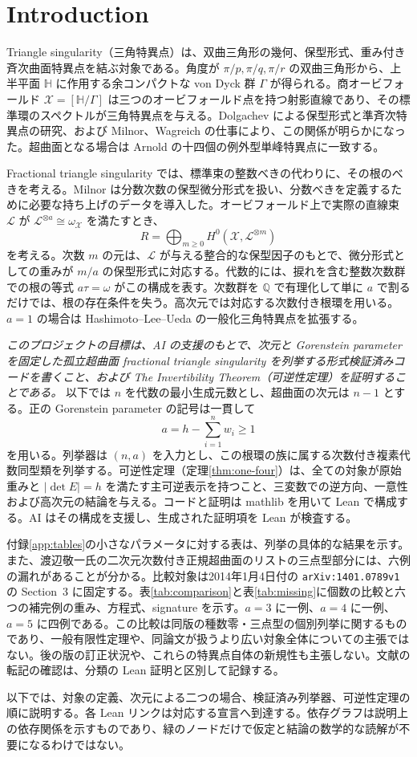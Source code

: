 \section*{Introduction}

Triangle singularity（三角特異点）は、双曲三角形の幾何、保型形式、重み付き斉次曲面特異点を結ぶ対象である。角度が $\pi/p,\pi/q,\pi/r$ の双曲三角形から、上半平面 $\mathbb H$ に作用する余コンパクトな von Dyck 群 $\Gamma$ が得られる。商オービフォールド $\mathcal X=[\mathbb H/\Gamma]$ は三つのオービフォールド点を持つ射影直線であり、その標準環のスペクトルが三角特異点を与える。Dolgachev による保型形式と準斉次特異点の研究、および Milnor、Wagreich の仕事により、この関係が明らかになった。超曲面となる場合は Arnold の十四個の例外型単峰特異点に一致する\cite{Dolgachev,Milnor,Wagreich,HLU}。

Fractional triangle singularity では、標準束の整数べきの代わりに、その根のべきを考える。Milnor は分数次数の保型微分形式を扱い、分数べきを定義するために必要な持ち上げのデータを導入した\cite[Sections 5--6]{Milnor}。オービフォールド上で実際の直線束 $\mathcal L$ が $\mathcal L^{\otimes a}\cong\omega_{\mathcal X}$ を満たすとき、
\[
 R=\bigoplus_{m\geq0}H^0(\mathcal X,\mathcal L^{\otimes m})
\]
を考える。次数 $m$ の元は、$\mathcal L$ が与える整合的な保型因子のもとで、微分形式としての重みが $m/a$ の保型形式に対応する。代数的には、捩れを含む整数次数群での根の等式 $a\tau=\omega$ がこの構成を表す。次数群を $\mathbb Q$ で有理化して単に $a$ で割るだけでは、根の存在条件を失う。高次元では対応する次数付き根環を用いる。$a=1$ の場合は Hashimoto--Lee--Ueda の一般化三角特異点を拡張する\cite{HLU}。

\emph{このプロジェクトの目標は、AI の支援のもとで、次元と Gorenstein parameter を固定した孤立超曲面 fractional triangle singularity を列挙する形式検証済みコードを書くこと、および The Invertibility Theorem（可逆性定理）を証明することである。} 以下では $n$ を代数の最小生成元数とし、超曲面の次元は $n-1$ とする。正の Gorenstein parameter の記号は一貫して
\[
 a=h-\sum_{i=1}^{n}w_i\geq1
\]
を用いる。列挙器は $(n,a)$ を入力とし、この根環の族に属する次数付き複素代数同型類を列挙する。可逆性定理（定理\ref{thm:one-four}）は、全ての対象が原始重みと $|\det E|=h$ を満たす主可逆表示を持つこと、三変数での逆方向、一意性および高次元の結論を与える。コードと証明は mathlib を用いて Lean で構成する。AI はその構成を支援し、生成された証明項を Lean が検査する。

付録\ref{app:tables}の小さなパラメータに対する表は、列挙の具体的な結果を示す。また、渡辺敬一氏の二次元次数付き正規超曲面のリストの三点型部分には、六例の漏れがあることが分かる。比較対象は2014年1月4日付の \texttt{arXiv:1401.0789v1} の Section~3 に固定する\cite{Watanabe}。表\ref{tab:comparison}と表\ref{tab:missing}に個数の比較と六つの補完例の重み、方程式、signature を示す。$a=3$ に一例、$a=4$ に一例、$a=5$ に四例である。この比較は同版の種数零・三点型の個別列挙に関するものであり、一般有限性定理や、同論文が扱うより広い対象全体についての主張ではない。後の版の訂正状況や、これらの特異点自体の新規性も主張しない。文献の転記の確認は、分類の Lean 証明と区別して記録する。

以下では、対象の定義、次元による二つの場合、検証済み列挙器、可逆性定理の順に説明する。各 Lean リンクは対応する宣言へ到達する。依存グラフは説明上の依存関係を示すものであり、緑のノードだけで仮定と結論の数学的な読解が不要になるわけではない。
